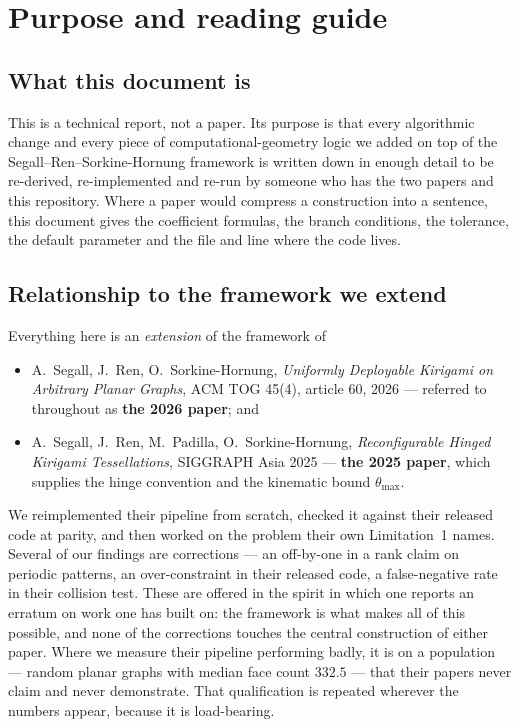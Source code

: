 \documentclass[11pt,a4paper]{article}
\theoremstyle{definition}
\begin{document}
\tableofcontents
\clearpage

\section{Purpose and reading guide}

\subsection{What this document is}

This is a technical report, not a paper. Its purpose is that every algorithmic change and
every piece of computational-geometry logic we added on top of the Segall--Ren--Sorkine-Hornung
framework is written down in enough detail to be re-derived, re-implemented and re-run by
someone who has the two papers and this repository. Where a paper would compress a
construction into a sentence, this document gives the coefficient formulas, the branch
conditions, the tolerance, the default parameter and the file and line where the code
lives.

\subsection{Relationship to the framework we extend}

Everything here is an \emph{extension} of the framework of
\begin{itemize}\itemsep2pt
\item A.\ Segall, J.\ Ren, O.\ Sorkine-Hornung, \emph{Uniformly Deployable Kirigami on
Arbitrary Planar Graphs}, ACM TOG 45(4), article 60, 2026 --- referred to throughout as
\textbf{the 2026 paper}; and
\item A.\ Segall, J.\ Ren, M.\ Padilla, O.\ Sorkine-Hornung, \emph{Reconfigurable Hinged
Kirigami Tessellations}, SIGGRAPH Asia 2025 --- \textbf{the 2025 paper}, which supplies
the hinge convention and the kinematic bound $\theta_{\max}$.
\end{itemize}
We reimplemented their pipeline from scratch, checked it against their released code at
parity, and then worked on the problem their own Limitation~1 names. Several of our
findings are corrections --- an off-by-one in a rank claim on periodic patterns, an
over-constraint in their released code, a false-negative rate in their collision test.
These are offered in the spirit in which one reports an erratum on work one has built on:
the framework is what makes all of this possible, and none of the corrections touches the
central construction of either paper. Where we measure their pipeline performing badly, it
is on a population --- random planar graphs with median face count $332.5$ --- that their
papers never claim and never demonstrate. That qualification is repeated wherever the
numbers appear, because it is load-bearing.
\end{document}
